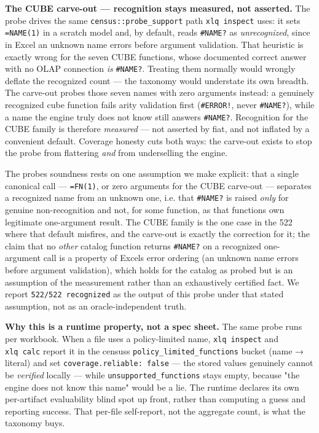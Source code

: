 \documentclass[
]{article}
\begin{document}
\textbf{The CUBE carve-out --- recognition stays measured, not
asserted.} The probe drives the same \texttt{census::probe\_support}
path \texttt{xlq\ inspect} uses: it sets \texttt{=NAME(1)} in a scratch
model and, by default, reads \texttt{\#NAME?} as \emph{unrecognized},
since in Excel an unknown name errors before argument validation. That
heuristic is exactly wrong for the seven CUBE functions, whose
documented correct answer with no OLAP connection \emph{is}
\texttt{\#NAME?}. Treating them normally would wrongly deflate the
recognized count --- the taxonomy would understate its own breadth. The
carve-out probes those seven names with zero arguments instead: a
genuinely recognized cube function fails arity validation first
(\texttt{\#ERROR!}, never \texttt{\#NAME?}), while a name the engine
truly does not know still answers \texttt{\#NAME?}. Recognition for the
CUBE family is therefore \emph{measured} --- not asserted by fiat, and
not inflated by a convenient default. Coverage honesty cuts both ways:
the carve-out exists to stop the probe from flattering \emph{and} from
underselling the engine.

The probe\textquotesingle s soundness rests on one assumption we make
explicit: that a single canonical call --- \texttt{=FN(1)}, or zero
arguments for the CUBE carve-out --- separates a recognized name from an
unknown one, i.e. that \texttt{\#NAME?} is raised \emph{only} for
genuine non-recognition and not, for some function, as that
function\textquotesingle s own legitimate one-argument result. The CUBE
family is the one case in the 522 where that default misfires, and the
carve-out is exactly the correction for it; the claim that no
\emph{other} catalog function returns \texttt{\#NAME?} on a recognized
one-argument call is a property of Excel\textquotesingle s error
ordering (an unknown name errors before argument validation), which
holds for the catalog as probed but is an assumption of the measurement
rather than an exhaustively certified fact. We report
\texttt{522/522\ recognized} as the output of this probe under that
stated assumption, not as an oracle-independent truth.

\textbf{Why this is a runtime property, not a spec sheet.} The same
probe runs per workbook. When a file uses a policy-limited name,
\texttt{xlq\ inspect} and \texttt{xlq\ calc} report it in the
census\textquotesingle s \texttt{policy\_limited\_functions} bucket
(name → literal) and set \texttt{coverage.reliable:\ false} --- the
stored values genuinely cannot be \emph{verified} locally --- while
\texttt{unsupported\_functions} stays empty, because "the engine does
not know this name" would be a lie. The runtime declares its own
per-artifact evaluability blind spot up front, rather than computing a
guess and reporting success. That per-file self-report, not the
aggregate count, is what the taxonomy buys.
\end{document}
